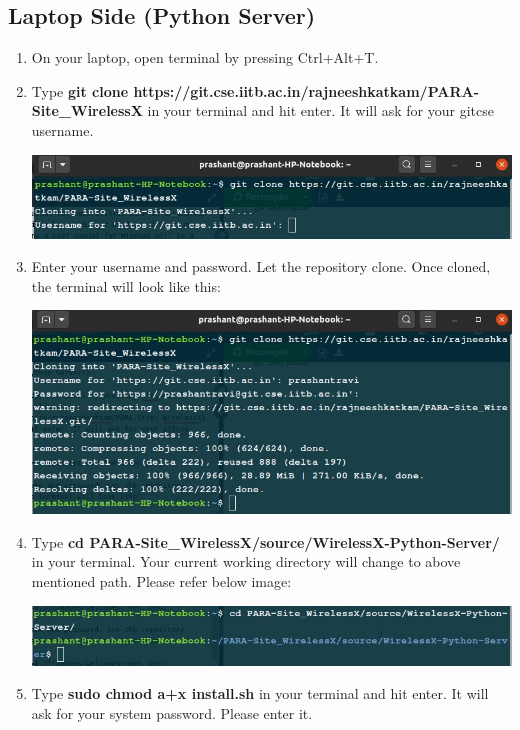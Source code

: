 \documentclass[12pt, letterpaper]{article}
\begin{document}
\subsection{Laptop Side (Python Server)}
\begin{enumerate}
    \item On your laptop, open terminal by pressing Ctrl+Alt+T.
    \item Type \textbf{git clone https://git.cse.iitb.ac.in/rajneeshkatkam/PARA-Site\_WirelessX} in your terminal and hit enter. It will ask for your gitcse username.
    \begin{center}
    \includegraphics[scale=0.5]{images/gitclone.jpg}
    \end{center}
    \item Enter your username and password. Let the repository clone. Once cloned, the terminal will look like this:
    \begin{center}
    \includegraphics[scale=0.5]{images/cloned.jpg}
    \end{center}
    \item Type \textbf{cd PARA-Site\_WirelessX/source/WirelessX-Python-Server/} in your terminal. Your current working directory will change to above mentioned path. Please refer below image:
    \begin{center}
    \includegraphics[scale=0.5]{images/cdDir.jpg}
    \end{center}
    \item Type \textbf{sudo chmod a+x install.sh} in your terminal and hit enter. It will ask for your system password. Please enter it.

\end{enumerate}
\end{document}

